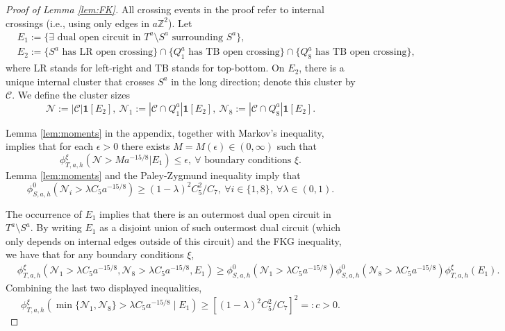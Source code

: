 \documentclass[article,12pt,reqno]{amsart}
\begin{document}
	
	\begin{proof}[Proof of Lemma \ref{lem:FK}]
    All crossing events in the proof refer to internal crossings (i.e., using only edges in $a\mathbb{Z}^2$).
        Let
		\begin{equation}\label{eq:E_1E_2}
			\begin{split}
				&E_1:=\{\exists \text{ dual open circuit in }T^a\setminus S^a \text{ surrounding }S^a\},\\
				&E_2:=\{S^a \text{ has LR open crossing}\}\cap \{Q^a_1 \text{ has TB open crossing}\} \cap \{Q^a_8 \text{ has TB open crossing}\},
			\end{split}
		\end{equation}
	where LR stands for left-right and TB stands for top-bottom. On $E_2$, there is a unique internal cluster that crosses $S^a$ in the long direction; denote this cluster by $\mathscr{C}$. We define the cluster sizes
    \begin{equation}\label{eq:Ndef}
        \mathcal{N}:=|\mathscr{C}|\mathbf{1}[{E_2}], \ 
        \mathcal{N}_1:=|\mathscr{C}\cap Q_1^a|\mathbf{1}[{E_2}], \  \mathcal{N}_8:=|\mathscr{C}\cap Q_8^a|\mathbf{1}[{E_2}].
    \end{equation}
    
    Lemma \ref{lem:moments} in the appendix, together with Markov's inequality, implies that for each $\epsilon>0$ there exists $M=M(\epsilon)\in(0,\infty)$ such that
	\begin{equation}\label{eq:Aevent}
		\phi_{T,a,h}^{\xi}(\mathcal{N}>Ma^{-15/8} | E_1) \leq \epsilon,~\forall \text{ boundary conditions }\xi.
	\end{equation}
	Lemma \ref{lem:moments} and the Paley-Zygmund inequality imply that
	\[\phi_{S,a,h}^0(\mathcal{N}_i >\lambda C_5 a^{-15/8})\geq (1-\lambda)^2 C_5^2/C_7,~\forall i\in\{1,8\},~ \forall \lambda\in(0,1).\]
	
	The occurrence of $E_1$ implies that there is an outermost dual open circuit in $T^a\setminus S^a$. By writing $E_1$ as a disjoint union of such outermost dual circuit (which only depends on internal edges outside of this circuit) and the FKG inequality, we have that for any boundary conditions $\xi$,
	\begin{align*}
		&\phi_{T,a,h}^{\xi}(\mathcal{N}_1 >\lambda C_5 a^{-15/8}, \mathcal{N}_8 >\lambda C_5 a^{-15/8}, E_1)%
        \geq \phi_{S,a,h}^{0}(\mathcal{N}_1>\lambda C_5 a^{-15/8})\phi_{S,a,h}^{0}(\mathcal{N}_8>\lambda C_5 a^{-15/8})\phi_{T,a,h}^{\xi}(E_1).
	\end{align*}
	Combining the last two displayed inequalities, %
	\begin{equation}\label{eq:Bevent}
		\phi_{T,a,h}^{\xi}(\min\{\mathcal{N}_1, \mathcal{N}_8\}>\lambda C_5 a^{-15/8} \mid E_1)\geq [(1-\lambda)^2 C_5^2/C_7]^2=:c>0.
	\end{equation}


\end{proof}
\end{document}
